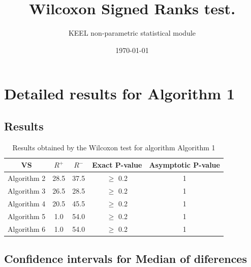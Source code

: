 \documentclass[a4paper,10pt]{article}
\title{Wilcoxon Signed Ranks test.}
\date{\today}
\author{KEEL non-parametric statistical module}
\begin{document}
\pagestyle{empty}
\maketitle
\thispagestyle{empty}



\section{Detailed results for Algorithm 1}


\subsection{Results}

\begin{table}[!htp]
\centering\small
\begin{tabular}{
|c|c|c|c|c|}
\hline
 VS & $R^{+}$ & $R^{-}$ & Exact P-value & Asymptotic P-value \\ \hline 
Algorithm 2 & 28.5 & 37.5 & $\geq$ 0.2 & 1\\ \hline 
Algorithm 3 & 26.5 & 28.5 & $\geq$ 0.2 & 1\\ \hline 
Algorithm 4 & 20.5 & 45.5 & $\geq$ 0.2 & 1\\ \hline 
Algorithm 5 & 1.0 & 54.0 & $\geq$ 0.2 & 1\\ \hline 
Algorithm 6 & 1.0 & 54.0 & $\geq$ 0.2 & 1\\ \hline 

\end{tabular}
\caption{Results obtained by the Wilcoxon test for algorithm Algorithm 1}
\end{table}

\subsection{Confidence intervals for Median of diferences}
\end{document}
